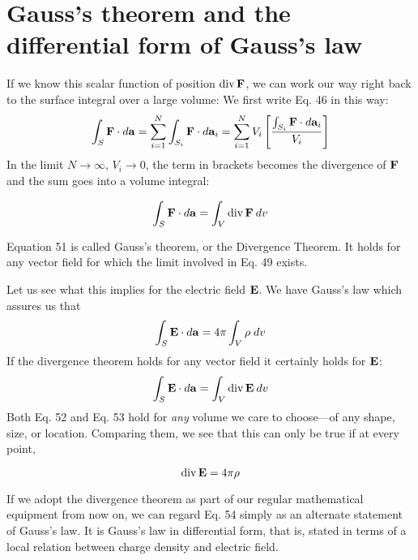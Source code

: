\section{Gauss's theorem and the differential form of Gauss's law}

If we know this scalar function of position $\operatorname{div}\mathbf{F}$, we can work our
way right back to the surface integral over a large volume: We first
write Eq. 46 in this way:
\begin{equation}
  \int_S\mathbf{F}\cdot d\mathbf{a} = \sum_{i=1}^N\int_{S_i} \mathbf{F}\cdot d\mathbf{a}_i
           = \sum_{i=1}^N V_i \left[\frac{\int_{S_i} \mathbf{F}\cdot d\mathbf{a}_i}{V_i}\right]
\end{equation}
In the limit $N \rightarrow \infty$, $V_i\rightarrow0$, the term in brackets becomes the divergence
of $\mathbf{F}$ and the sum goes into a volume integral:
\begin{framed}
\begin{equation}
  \int_S\mathbf{F}\cdot d\mathbf{a} = \int_V \operatorname{div}\mathbf{F}\:d v
\end{equation}
\end{framed}
Equation 51 is called Gauss's theorem, or the Divergence Theorem.
It holds for any vector field for which the limit involved in Eq. 49
exists.

Let us see what this implies for the electric field $\mathbf{E}$. We have
Gauss's law which assures us that
\begin{equation}
  \int_S\mathbf{E}\cdot d\mathbf{a} = 4\pi\int_V\rho\;d v
\end{equation}
If the divergence theorem holds for any vector field it certainly holds
for $\mathbf{E}$:
\begin{equation}
  \int_S\mathbf{E}\cdot d\mathbf{a} = \int_V \operatorname{div}\mathbf{E}\:d v
\end{equation}
Both Eq. 52 and Eq. 53 hold for \emph{any} volume we care to choose---of
any shape, size, or location. Comparing them, we see that this can
only be true if at every point,
\begin{framed}
\begin{equation}
  \operatorname{div}\mathbf{E} = 4\pi\rho
\end{equation}
\end{framed}
If we adopt the divergence theorem as part of our regular mathematical
equipment from now on, we can regard Eq. 54 simply as an alternate
statement of Gauss's law. It is Gauss's law in differential form,
that is, stated in terms of a local relation between charge density and
electric field.

